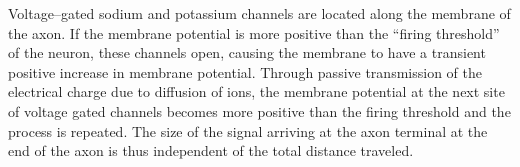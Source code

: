 		Voltage--gated sodium and potassium channels are located along the membrane of the axon.
		If the membrane potential is more positive than the ``firing threshold'' of the neuron, these channels open, causing the membrane to have a transient positive increase in membrane potential.
		Through passive transmission of the electrical charge due to diffusion of ions, the membrane potential at the next site of voltage gated channels becomes more positive than the firing threshold and the process is repeated.
		The size of the signal arriving at the axon terminal at the end of the axon is thus independent of the total distance traveled.
		\cite{PrinciplesOfNeuralScience4edKAP09}



